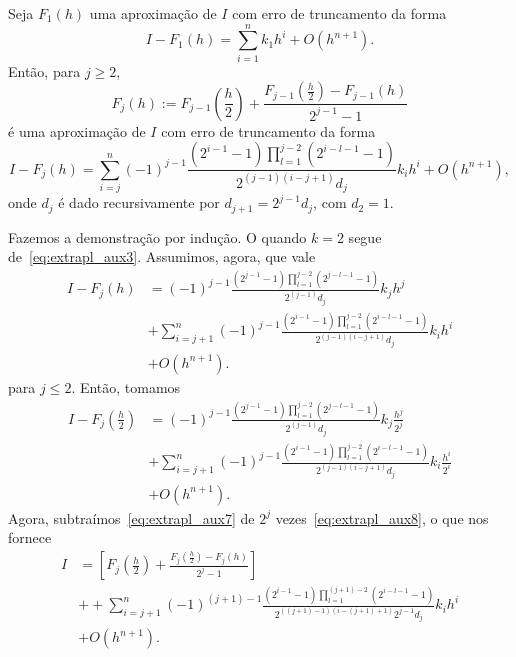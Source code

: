 \begin{teo}
  Seja $F_1(h)$ uma aproximação de $I$ com erro de truncamento da forma
  \begin{equation}
    I-F_1(h) = \sum_{i=1}^n k_1h^i + O(h^{n+1}).
  \end{equation}
Então, para $j\geq 2$,
\begin{equation}
  F_j(h) := F_{j-1}\left(\frac{h}{2}\right) + \frac{F_{j-1}\left(\frac{h}{2}\right) - F_{j-1}(h)}{2^{j-1}-1}
\end{equation}
é uma aproximação de $I$ com erro de truncamento da forma
\begin{equation}
  I-F_{j}(h) = \sum_{i=j}^n (-1)^{j-1}\frac{\left(2^{i-1}-1\right)\prod_{l=1}^{j-2}\left(2^{i-l-1}-1\right)}{2^{(j-1)(i-j+1)}d_j}k_ih^i + O(h^{n+1}),
\end{equation}
onde $d_{j}$ é dado recursivamente por $d_{j+1}=2^{j-1}d_j$, com $d_2=1$.
\end{teo}
\begin{dem}
  Fazemos a demonstração por indução. O quando $k=2$ segue de~\eqref{eq:extrapl_aux3}. Assumimos, agora, que vale
  \begin{align}
    I-F_{j}(h) &= (-1)^{j-1}\frac{\left(2^{j-1}-1\right)\prod_{l=1}^{j-2}\left(2^{j-l-1}-1\right)}{2^{(j-1)}d_j}k_jh^j \nonumber \\
              &+ \sum_{i=j+1}^n (-1)^{j-1}\frac{\left(2^{i-1}-1\right)\prod_{l=1}^{j-2}\left(2^{i-l-1}-1\right)}{2^{(j-1)(i-j+1)}d_j}k_ih^i \nonumber \\
              & + O(h^{n+1}).\label{eq:extrapl_aux7}
  \end{align}
para $j\leq 2$. Então, tomamos
\begin{align}
  I-F_{j}\left(\frac{h}{2}\right) &= (-1)^{j-1}\frac{\left(2^{j-1}-1\right)\prod_{l=1}^{j-2}\left(2^{j-l-1}-1\right)}{2^{(j-1)}d_j}k_j\frac{h^j}{2^j} \nonumber \\
              &+ \sum_{i=j+1}^n (-1)^{j-1}\frac{\left(2^{i-1}-1\right)\prod_{l=1}^{j-2}\left(2^{i-l-1}-1\right)}{2^{(j-1)(i-j+1)}d_j}k_i\frac{h^i}{2^i} \nonumber \\
              & + O(h^{n+1}). \label{eq:extrapl_aux8}
\end{align}
Agora, subtraímos~\eqref{eq:extrapl_aux7} de $2^{j}$ vezes~\eqref{eq:extrapl_aux8}, o que nos fornece
\begin{align}
  I &= \left[F_{j}\left(\frac{h}{2}\right) + \frac{F_{j}\left(\frac{h}{2}\right) - F_{j}(h)}{2^{j}-1}\right] \nonumber\\
    &+ + \sum_{i=j+1}^n (-1)^{(j+1)-1}\frac{\left(2^{i-1}-1\right)\prod_{l=1}^{(j+1)-2}\left(2^{i-l-1}-1\right)}{2^{((j+1)-1)(i-(j+1)+1)}2^{j-1}d_j}k_ih^i\nonumber \\
              & + O(h^{n+1}).
\end{align}
\end{dem}


\emconstrucao